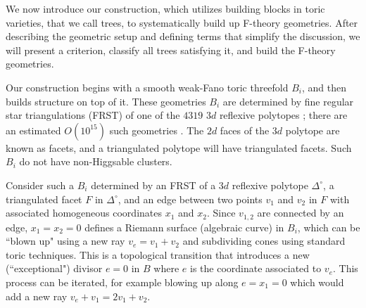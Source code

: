 \documentclass[aps,prl,twocolumn, superscriptaddress,groupedaddress,nofootinbib]{revtex4-1}
\begin{document}
\vspace{.2cm}

We now introduce our construction, which utilizes building blocks in toric
varieties, that we call trees, to systematically build up F-theory geometries.
After describing the geometric setup and defining terms that simplify the
discussion, we will present a criterion, classify all trees satisfying it, and
build the F-theory geometries.


Our construction begins with a smooth weak-Fano toric threefold $B_i$, and
then builds structure on top of it. These geometries $B_i$ are  determined by
fine regular star triangulations (FRST) of one of the $4319$  $3d$ reflexive
polytopes \cite{Kreuzer:1998vb}; there are an estimated
 $O(10^{15})$ such geometries \cite{Halverson:2016tve}. The $2d$
faces of the $3d$ polytope are known as facets, and a triangulated polytope
will have triangulated facets.  Such $B_i$ do not have non-Higgsable clusters.

Consider such a $B_i$ determined by an FRST of a $3d$ reflexive polytope
$\Delta^\circ$, a triangulated facet $F$ in $\Delta^\circ$, and an edge
between two points $v_1$ and $v_2$ in $F$ with
associated homogeneous coordinates $x_1$ and $x_2$. Since $v_{1,2}$ are connected
by an edge, $x_1=x_2=0$ defines a Riemann surface (algebraic curve)
in $B_i$, which can be ``blown up" using a new ray $v_e=v_1+v_2$ and subdividing
cones using standard toric techniques. This is a topological transition that introduces
a new (``exceptional") divisor $e=0$ in $B$ where $e$ is the coordinate associated to $v_e$.
This
process can be iterated, for example blowing up along $e=x_1=0$ which would
add a new ray $v_e+v_1=2v_1+v_2$.
\end{document}
